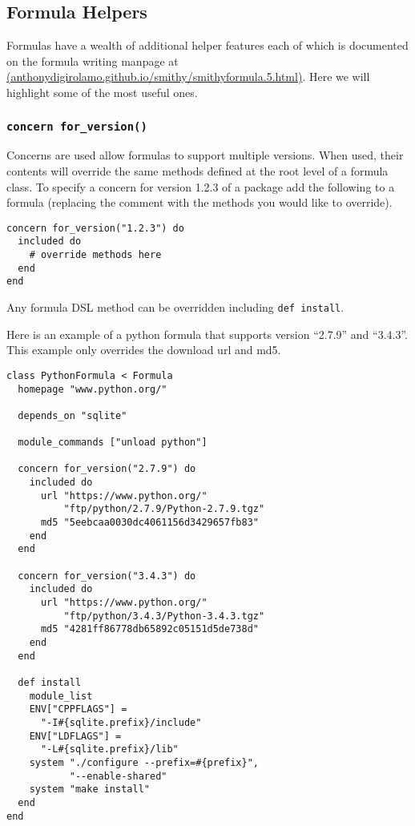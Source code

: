 \documentclass{acm_proc_article-sp}
\begin{document}
\subsection{Formula Helpers}

Formulas have a wealth of additional helper features each of which is documented
on the formula writing manpage at \\
\href{http://anthonydigirolamo.github.io/smithy/smithyformula.5.html}{(anthonydigirolamo.github.io/smithy/smithyformula.5.html)}.
Here we will highlight some of the most useful ones.

\subsubsection{\texttt{concern for\_version()}}

Concerns are used allow formulas to support multiple versions. When used, their
contents will override the same methods defined at the root level of a formula
class. To specify a concern for version 1.2.3 of a package add the following to
a formula (replacing the comment with the methods you would like to override).

\begin{quoting}
\begin{verbatim}
concern for_version("1.2.3") do
  included do
    # override methods here
  end
end
\end{verbatim}
\end{quoting}

Any formula DSL method can be overridden including \texttt{def install}.

Here is an example of a python formula that supports version ``2.7.9'' and
``3.4.3''. This example only overrides the download url and md5.

\begin{quoting}
\begin{verbatim}
class PythonFormula < Formula
  homepage "www.python.org/"

  depends_on "sqlite"

  module_commands ["unload python"]

  concern for_version("2.7.9") do
    included do
      url "https://www.python.org/"
          "ftp/python/2.7.9/Python-2.7.9.tgz"
      md5 "5eebcaa0030dc4061156d3429657fb83"
    end
  end

  concern for_version("3.4.3") do
    included do
      url "https://www.python.org/"
          "ftp/python/3.4.3/Python-3.4.3.tgz"
      md5 "4281ff86778db65892c05151d5de738d"
    end
  end

  def install
    module_list
    ENV["CPPFLAGS"] =
      "-I#{sqlite.prefix}/include"
    ENV["LDFLAGS"] =
      "-L#{sqlite.prefix}/lib"
    system "./configure --prefix=#{prefix}",
           "--enable-shared"
    system "make install"
  end
end
\end{verbatim}
\end{quoting}
\end{document}
